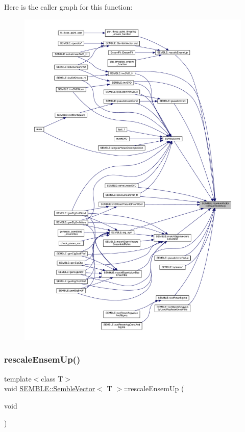 Here is the caller graph for this function\+:
\nopagebreak
\begin{figure}[H]
\begin{center}
\leavevmode
\includegraphics[width=350pt]{d9/d94/structSEMBLE_1_1SembleVector_ade3ccfd44ba282c06bf32c0a1c800d2f_icgraph}
\end{center}
\end{figure}
\mbox{\label{structSEMBLE_1_1SembleVector_ade3ccfd44ba282c06bf32c0a1c800d2f}} 
\subsubsection{\texorpdfstring{rescaleEnsemUp()}{rescaleEnsemUp()}\hspace{0.1cm}{\footnotesize\ttfamily [2/2]}}
{\footnotesize\ttfamily template$<$class T$>$ \\
void \mbox{\hyperlink{structSEMBLE_1_1SembleVector}{S\+E\+M\+B\+L\+E\+::\+Semble\+Vector}}$<$ T $>$\+::rescale\+Ensem\+Up (\begin{DoxyParamCaption}\item[{void}]{ }\end{DoxyParamCaption})\hspace{0.3cm}{\ttfamily [inline]}}

